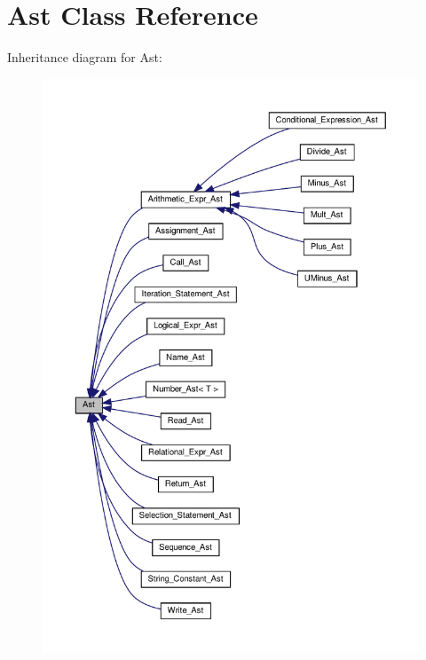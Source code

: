 \hypertarget{classAst}{}\section{Ast Class Reference}
\label{classAst}


Inheritance diagram for Ast\+:
\nopagebreak
\begin{figure}[H]
\begin{center}
\leavevmode
\includegraphics[width=350pt]{classAst__inherit__graph}
\end{center}
\end{figure}
